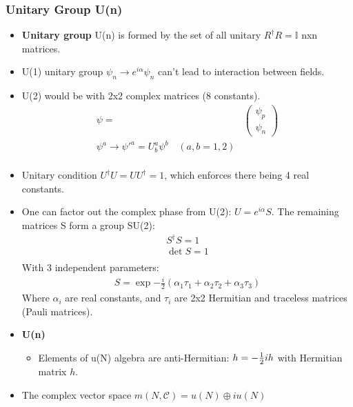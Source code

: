 \subsubsection{Unitary Group U(n)}
\begin{itemize}
    \item \textbf{Unitary group} U(n) is formed by the set of all unitary $R^\dagger R=\mathbb{I}$ nxn matrices. \cite{robinson}
    \item U(1) unitary group $\psi_n\to e^{i\alpha}\psi_n$ can't lead to interaction between fields. \cite{hokim}
    \item U(2) would be with 2x2  complex matrices (8 constants). \cite{hokim}
    \begin{equation}\begin{split}
    \psi=&\begin{pmatrix}\psi_p\\\psi_n\end{pmatrix} \\
    \psi^a\to\psi'^a=U^a_b\psi^b \quad(a,b=1,2) \\
    \end{split}\end{equation}
    \item Unitary condition $U^\dagger U=UU^\dagger=1$, which enforces there being 4 real constants. \cite{hokim}
    \item One can factor out the complex phase from U(2): $U=e^{i\alpha}S$. The remaining matrices S form a group SU(2): \cite{hokim}
    \begin{equation}\begin{split}
    S^\dagger S=1 \\
    \det{S}=1 \\
    \end{split}\end{equation}
    With 3 independent parameters:
    \begin{equation}\begin{split}
    S=\exp{-\frac{i}{2}(\alpha_1\tau_1+\alpha_2\tau_2+\alpha_3\tau_3)}
    \end{split}\end{equation}
    Where $\alpha_i$ are real constants, and $\tau_i$ are 2x2 Hermitian and traceless matrices (Pauli matrices).
    \item \textbf{U(n)} \cite{pfeifer}
    \begin{itemize}
        \item Elements of u(N) algebra are anti-Hermitian: $h=-\frac{1}{2} ih$ with Hermitian matrix $h$. \cite{pfeifer}
    \end{itemize}
    \item The complex vector space $m(N,\mathcal{C})=u(N)\oplus iu(N)$ \cite{pfeifer}
\end{itemize}

